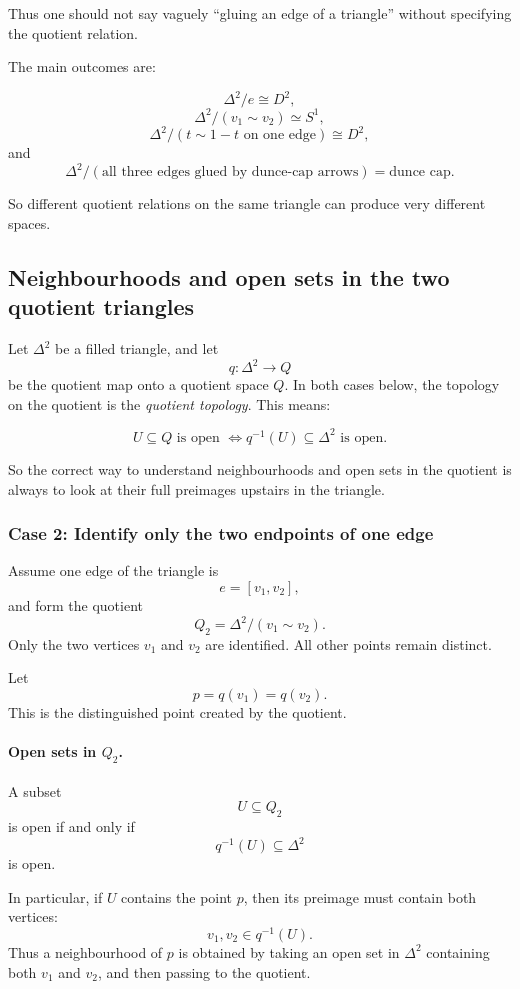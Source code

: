 \documentclass[12pt,a4paper]{article}
\theoremstyle{notespace}
\begin{document}
Thus one should not say vaguely ``gluing an edge of a triangle'' without specifying the quotient relation.

The main outcomes are:

\[
\Delta^2/e \cong D^2,
\]
\[
\Delta^2/(v_1\sim v_2)\simeq S^1,
\]
\[
\Delta^2/(t\sim 1-t \text{ on one edge})\cong D^2,
\]
and
\[
\Delta^2/(\text{all three edges glued by dunce-cap arrows})
=
\text{dunce cap}.
\]

So different quotient relations on the same triangle can produce very different spaces.

\subsection{Neighbourhoods and open sets in the two quotient triangles}

Let \(\Delta^2\) be a filled triangle, and let
\[
q:\Delta^2\to Q
\]
be the quotient map onto a quotient space \(Q\). In both cases below, the topology on the quotient is the \emph{quotient topology}. This means:

\[
U\subseteq Q \text{ is open }
\Longleftrightarrow
q^{-1}(U)\subseteq \Delta^2 \text{ is open.}
\]

So the correct way to understand neighbourhoods and open sets in the quotient is always to look at their full preimages upstairs in the triangle.

\subsubsection{Case 2: Identify only the two endpoints of one edge}

Assume one edge of the triangle is
\[
e=[v_1,v_2],
\]
and form the quotient
\[
Q_2=\Delta^2/(v_1\sim v_2).
\]
Only the two vertices \(v_1\) and \(v_2\) are identified. All other points remain distinct.

Let
\[
p=q(v_1)=q(v_2).
\]
This is the distinguished point created by the quotient.

\paragraph{Open sets in \(Q_2\).}
A subset
\[
U\subseteq Q_2
\]
is open if and only if
\[
q^{-1}(U)\subseteq \Delta^2
\]
is open.

In particular, if \(U\) contains the point \(p\), then its preimage must contain both vertices:
\[
v_1,v_2\in q^{-1}(U).
\]
Thus a neighbourhood of \(p\) is obtained by taking an open set in \(\Delta^2\) containing both \(v_1\) and \(v_2\), and then passing to the quotient.
\end{document}
